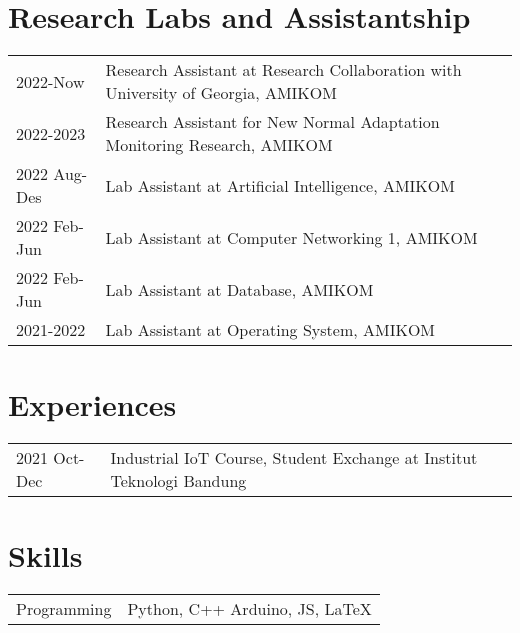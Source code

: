 \documentclass[12pt,letterpaper]{report}
\begin{document}
    \section*{Research Labs and Assistantship}
    \begin{tabular}{@{}p{}p{}}
        2022-Now & Research Assistant at Research Collaboration with University of Georgia, AMIKOM \\
        2022-2023 & Research Assistant for New Normal Adaptation Monitoring Research, AMIKOM \\
        2022 Aug-Des & Lab Assistant at Artificial Intelligence, AMIKOM \\
        2022 Feb-Jun & Lab Assistant at Computer Networking 1, AMIKOM \\
        2022 Feb-Jun & Lab Assistant at Database, AMIKOM \\
        2021-2022 & Lab Assistant at Operating System, AMIKOM \\
    \end{tabular}


    \section*{Experiences}
    \begin{tabular}{@{}p{}p{}}
        2021 Oct-Dec & Industrial IoT Course, Student Exchange at Institut Teknologi Bandung
    \end{tabular}

    \section*{Skills}
    \begin{tabular}{@{}p{}p{}}
        Programming & Python, C++ Arduino, JS, \LaTeX \\
    \end{tabular}
\end{document}
